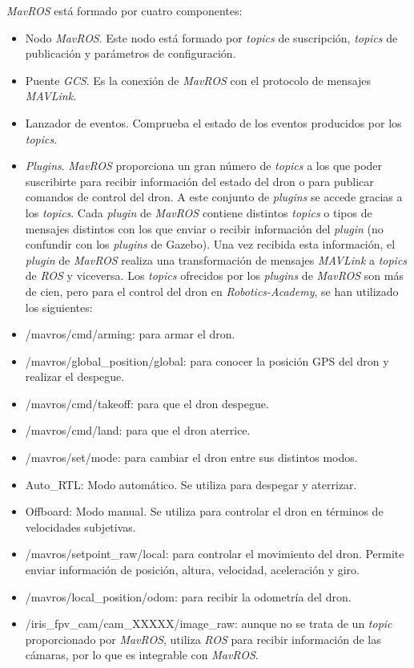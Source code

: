 \textit{MavROS} está formado por cuatro componentes:
\begin{itemize}
    \item Nodo \textit{MavROS}. Este nodo está formado por \textit{topics} de suscripción, \textit{topics} de publicación y parámetros de configuración.
    \item Puente \textit{GCS}. Es la conexión de \textit{MavROS} con el protocolo de mensajes \textit{MAVLink}.
    \item Lanzador de eventos. Comprueba el estado de los eventos producidos por los \textit{topics}.
    \item \textit{Plugins}. \textit{MavROS} proporciona un gran número de \textit{topics} a los que poder suscribirte para recibir información del estado del dron o para publicar comandos de control del dron. A este conjunto de \textit{plugins} se accede gracias a los \textit{topics}. Cada \textit{plugin} de \textit{MavROS} contiene distintos \textit{topics} o tipos de mensajes distintos con los que enviar o recibir información del \textit{plugin} (no confundir con los \textit{plugins} de Gazebo). Una vez recibida esta información, el \textit{plugin}  de \textit{MavROS} realiza una transformación de mensajes \textit{MAVLink} a \textit{topics} de \textit{ROS} y viceversa.  Los \textit{topics} ofrecidos por los \textit{plugins} de \textit{MavROS} son más de cien, pero para el control del dron en \textit{Robotics-Academy}, se han utilizado los siguientes:
        \item /mavros/cmd/arming: para armar el dron.
        \item /mavros/global\_position/global: para conocer la posición GPS del dron y realizar el despegue.
        \item /mavros/cmd/takeoff: para que el dron despegue.
        \item /mavros/cmd/land: para que el dron aterrice.
        \item /mavros/set/mode: para cambiar el dron entre sus distintos modos.
            \item Auto\_RTL: Modo automático. Se utiliza para despegar y aterrizar.
            \item Offboard: Modo manual. Se utiliza para controlar el dron en términos de velocidades subjetivas.
        \item /mavros/setpoint\_raw/local: para controlar el movimiento del dron. Permite enviar información de posición, altura, velocidad, aceleración y giro. 
        \item /mavros/local\_position/odom: para recibir la odometría del dron.
        \item /iris\_fpv\_cam/cam\_XXXXX/image\_raw: aunque no se trata de un \textit{topic} proporcionado por \textit{MavROS}, utiliza \textit{ROS} para recibir información de las cámaras, por lo que es integrable con \textit{MavROS}.
\end{itemize}
